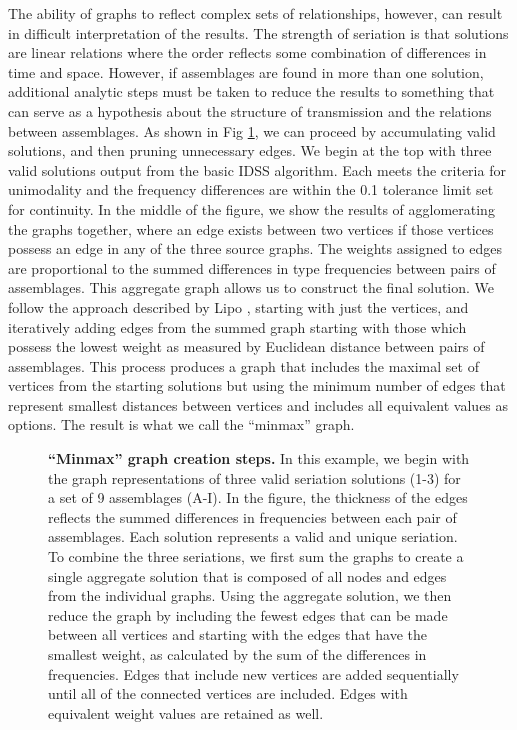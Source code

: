 \documentclass[10pt,letterpaper]{article}
\begin{document}
The ability of graphs to reflect complex sets of relationships, however, can result in difficult interpretation of the results. The strength of seriation is that solutions are linear relations where the order reflects some combination of differences in time and space. However, if assemblages are found in more than one solution, additional analytic steps must be taken to reduce the results to something that can serve as a hypothesis about the structure of transmission and the relations between assemblages. As shown in Fig \ref{fig6}, we can proceed by accumulating valid solutions, and then pruning unnecessary edges. We begin at the top with three valid solutions output from the basic IDSS algorithm. Each meets the criteria for unimodality and the frequency differences are within the 0.1 tolerance limit set for continuity. In the middle of the figure, we show the results of agglomerating the graphs together, where an edge exists between two vertices if those vertices possess an edge in any of the three source graphs. The weights assigned to edges are proportional to the summed differences in type frequencies between pairs of assemblages. This aggregate graph allows us to construct the final solution. We follow the approach described by Lipo \cite{Lipo2005}, starting with just the vertices, and iteratively adding edges from the summed graph starting with those which possess the lowest weight as measured by Euclidean distance between pairs of assemblages. This process produces a graph that includes the maximal set of vertices from the starting solutions but using the minimum number of edges that represent smallest distances between vertices and includes all equivalent values as options. The result is what we call the ``minmax'' graph.

\begin{figure}[h]
\caption{{\bf  ``Minmax'' graph creation steps. } In this example, we begin with the graph representations of three valid seriation solutions (1-3) for a set of 9 assemblages (A-I). In the figure, the thickness of the edges reflects the summed differences in frequencies between each pair of assemblages. Each solution represents a valid and unique seriation.  To combine the three seriations, we first sum the graphs to create a single aggregate solution that is composed of all nodes and edges from the individual graphs. Using the aggregate solution, we then reduce the graph by including the fewest edges that can be made between all vertices and starting with the edges that have the smallest weight, as calculated by the sum of the differences in frequencies. Edges that include new vertices are added sequentially until all of the connected vertices are included. Edges with equivalent weight values are retained as well.}
\label{fig6}
\end{figure}
\end{document}
